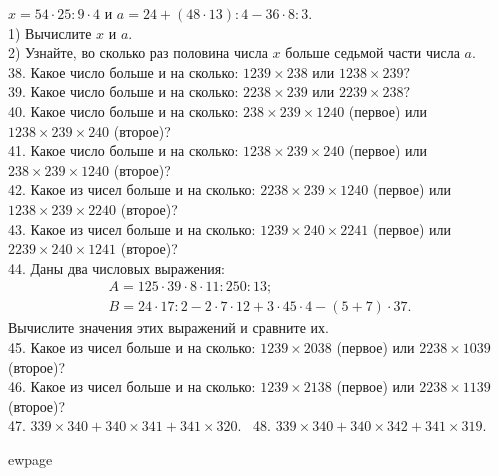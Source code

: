 $x=54\cdot25:9\cdot4$ и $a=24+(48\cdot13):4-36\cdot8:3.$\\
1) Вычислите $x$ и $a.$\\
2) Узнайте, во сколько раз половина числа $x$ больше седьмой части числа $a.$\\
38. Какое число больше и на сколько: $1239\times238$ или $1238\times239?$\\
39. Какое число больше и на сколько: $2238\times239$ или $2239\times238?$\\
40. Какое число больше и на сколько: $238\times239\times1240$ (первое) или $1238\times239\times240$ (второе)?\\
41. Какое число больше и на сколько: $1238\times239\times240$ (первое) или $238\times239\times1240$ (второе)?\\
42. Какое из чисел больше и на сколько: $2238\times239\times1240$ (первое) или $1238\times239\times2240$ (второе)?\\
43. Какое из чисел больше и на сколько: $1239\times240\times2241$ (первое) или $2239\times240\times1241$ (второе)?\\
44. Даны два числовых выражения:
$$\begin{array}{l} A=125\cdot39\cdot8\cdot11:250:13;\\ B=24\cdot17:2-2\cdot7\cdot12+3\cdot45\cdot4-(5+7)\cdot37.\end{array}$$
Вычислите значения этих выражений и сравните их.\\
45. Какое из чисел больше и на сколько: $1239\times2038$ (первое) или $2238\times1039$ (второе)?\\
46. Какое из чисел больше и на сколько: $1239\times2138$ (первое) или $2238\times1139$ (второе)?\\
47. $339 \times 340 + 340 \times 341 + 341 \times 320.$ \
48. $339 \times 340 + 340 \times 342 + 341 \times 319.$

ewpage
